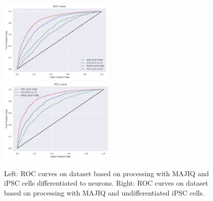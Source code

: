\begin{figure}
	\centering\includegraphics[width=0.49\textwidth]{../visualizations/ch5-results/majiq_neuron_cross_model_roc_auc_comparison.png} 
	\centering\includegraphics[width=0.5\textwidth]{../visualizations/ch5-results/majiq_ipsc_cross_model_roc_auc_comparison.png} 
	\caption{Left: ROC curves on dataset based on processing with MAJIQ and iPSC cells differentiated to neurons. Right: ROC curves on dataset based on processing with MAJIQ and undifferentiated iPSC cells. }
	\label{fig:majiq_rocs}
\end{figure}


%

